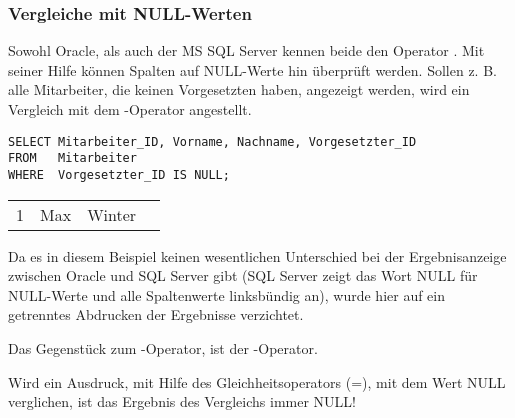 \subsubsection{Vergleiche mit NULL-Werten}
Sowohl Oracle, als auch der MS SQL Server kennen beide den Operator . Mit seiner Hilfe können Spalten auf NULL-Werte hin überprüft werden. Sollen z. B. alle Mitarbeiter, die keinen Vorgesetzten haben, angezeigt werden, wird ein Vergleich mit dem -Operator angestellt.
\begin{lstlisting}[language=oracle_sql,caption={Der IS NULL Operator},label=sql02_10]
SELECT Mitarbeiter_ID, Vorname, Nachname, Vorgesetzter_ID
FROM   Mitarbeiter
WHERE  Vorgesetzter_ID IS NULL;
          \end{lstlisting}
\begin{center}
    \begin{small}
        \tablehead{}
        \begin{msoraclesql}
            \begin{supertabular}{rllr}
                1 & Max & Winter & \\
            \end{supertabular}
        \end{msoraclesql}
    \end{small}
\end{center}
Da es in diesem Beispiel keinen wesentlichen Unterschied bei der Ergebnisanzeige zwischen Oracle und SQL Server gibt (SQL Server zeigt das Wort NULL für NULL-Werte und alle Spaltenwerte linksbündig an), wurde hier auf ein getrenntes Abdrucken der Ergebnisse verzichtet.

Das Gegenstück zum -Operator, ist der -Operator.
\clearpage
\begin{merke}
    Wird ein Ausdruck, mit Hilfe des Gleichheitsoperators (=), mit dem Wert NULL verglichen, ist das Ergebnis des Vergleichs immer NULL!
\end{merke}
